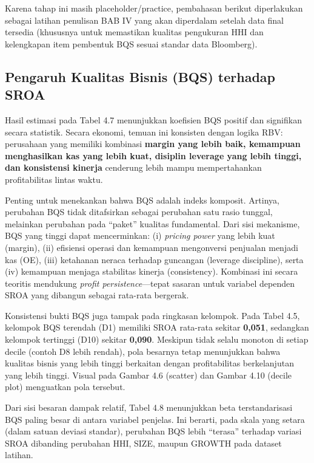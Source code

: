 \documentclass[12pt,a4paper]{report}
\begin{document}
Karena tahap ini masih placeholder/practice, pembahasan berikut
diperlakukan sebagai latihan penulisan BAB IV yang akan diperdalam
setelah data final tersedia (khususnya untuk memastikan kualitas
pengukuran HHI dan kelengkapan item pembentuk BQS sesuai standar data
Bloomberg).

\hypertarget{pengaruh-kualitas-bisnis-bqs-terhadap-sroa}{%
\subsection{Pengaruh Kualitas Bisnis (BQS) terhadap
SROA}\label{pengaruh-kualitas-bisnis-bqs-terhadap-sroa}}

Hasil estimasi pada Tabel 4.7 menunjukkan koefisien BQS positif dan
signifikan secara statistik. Secara ekonomi, temuan ini konsisten dengan
logika RBV: perusahaan yang memiliki kombinasi \textbf{margin yang lebih
baik, kemampuan menghasilkan kas yang lebih kuat, disiplin leverage yang
lebih tinggi, dan konsistensi kinerja} cenderung lebih mampu
mempertahankan profitabilitas lintas waktu.

Penting untuk menekankan bahwa BQS adalah indeks komposit. Artinya,
perubahan BQS tidak ditafsirkan sebagai perubahan satu rasio tunggal,
melainkan perubahan pada ``paket'' kualitas fundamental. Dari sisi
mekanisme, BQS yang tinggi dapat mencerminkan: (i) \emph{pricing power}
yang lebih kuat (margin), (ii) efisiensi operasi dan kemampuan
mengonversi penjualan menjadi kas (OE), (iii) ketahanan neraca terhadap
guncangan (leverage discipline), serta (iv) kemampuan menjaga stabilitas
kinerja (consistency). Kombinasi ini secara teoritis mendukung
\emph{profit persistence}---tepat sasaran untuk variabel dependen SROA
yang dibangun sebagai rata-rata bergerak.

Konsistensi bukti BQS juga tampak pada ringkasan kelompok. Pada Tabel
4.5, kelompok BQS terendah (D1) memiliki SROA rata-rata sekitar
\textbf{0,051}, sedangkan kelompok tertinggi (D10) sekitar
\textbf{0,090}. Meskipun tidak selalu monoton di setiap decile (contoh
D8 lebih rendah), pola besarnya tetap menunjukkan bahwa kualitas bisnis
yang lebih tinggi berkaitan dengan profitabilitas berkelanjutan yang
lebih tinggi. Visual pada Gambar 4.6 (scatter) dan Gambar 4.10 (decile
plot) menguatkan pola tersebut.

Dari sisi besaran dampak relatif, Tabel 4.8 menunjukkan beta
terstandarisasi BQS paling besar di antara variabel penjelas. Ini
berarti, pada skala yang setara (dalam satuan deviasi standar),
perubahan BQS lebih ``terasa'' terhadap variasi SROA dibanding perubahan
HHI, SIZE, maupun GROWTH pada dataset latihan.
\end{document}
